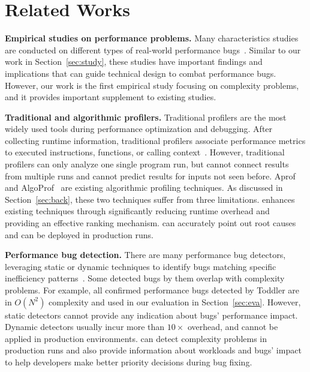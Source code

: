 
\section{Related Works}
\label{sec:related}

\noindent\textbf{Empirical studies on performance problems.}
Many characteristics studies are conducted on different types 
of real-world performance
bugs~\cite{PerfBug,SongOOPSLA2014,ldoctor,Zaman2012MSR,Nistor2013MSR,HuangRegression,SmartphoneStudy,junwen-1, junwen-2}.
Similar to our work in Section~\ref{sec:study},
these studies have important findings and 
implications 
that can guide technical design to combat
performance bugs.
However, our work is the first empirical study focusing 
on complexity problems,
and it provides important supplement to existing studies.


\noindent\textbf{Traditional and algorithmic profilers.}
Traditional profilers are the most widely used tools
during performance optimization and debugging.
After collecting runtime information,
traditional profilers associate performance metrics to executed instructions,
functions, or 
calling context~\cite{oprofile,gprof,CCT,4Profilers,LagHunter,AppInsight,AdaptiveBurst,HotCallingContext}.
However, traditional profilers can only analyze one single program run,
but cannot connect results from multiple runs and cannot
predict results for inputs not seen before.
Aprof~\cite{Aprof1, Aprof2} and AlgoProf~\cite{AlgoProf} are existing
algorithmic profiling techniques.
As discussed in Section~\ref{sec:back},
these two techniques suffer from three limitations. 
\Tool enhances existing techniques through significantly 
reducing runtime overhead and providing an effective ranking mechanism. 
\Tool can accurately point out root causes 
and can be deployed in production runs. 

\noindent\textbf{Performance bug detection.}
There are many performance bug detectors, 
leveraging static or dynamic techniques to
identify bugs matching specific inefficiency
patterns~\cite{yufei-perf,CLARITY,xiao13:context,PerfBug,Alabama,CARAMEL,XuDataStructure,XuBloatPLDI2009,XuBloatPLDI2010,Cachetor,LoopInvariant,falsesharing}.
Some detected bugs by them overlap with complexity problems.
For example, 
all confirmed performance bugs detected by Toddler are 
in $O(N^2)$ complexity and used in our evaluation in Section~\ref{sec:eva}.
However, static detectors cannot provide any indication
about bugs' performance impact.
Dynamic detectors usually incur more than $10\times$ overhead,
and cannot be applied in production environments.
\Tool can detect complexity problems in production runs 
and also provide information about workloads and bugs' impact 
to help developers make better priority decisions during bug fixing. 